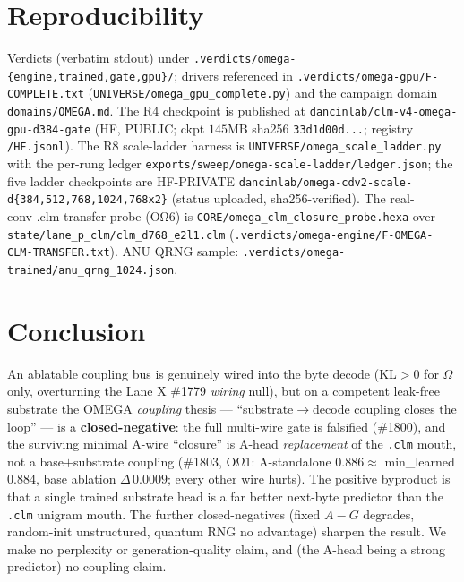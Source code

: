 \documentclass[11pt]{article}
\begin{document}
\section{Reproducibility}
\label{sec:repro}
Verdicts (verbatim stdout) under \texttt{.verdicts/omega-\{engine,trained,gate,gpu\}/}; drivers
referenced in \texttt{.verdicts/omega-gpu/F-COMPLETE.txt} (\texttt{UNIVERSE/omega\_gpu\_complete.py})
and the campaign domain \texttt{domains/OMEGA.md}. The R4 checkpoint is published at
\texttt{dancinlab/clm-v4-omega-gpu-d384-gate} (HF, PUBLIC; ckpt $145$MB
sha256 \texttt{33d1d00d...}; registry \texttt{/HF.jsonl}). The R8 scale-ladder harness is
\texttt{UNIVERSE/omega\_scale\_ladder.py} with the per-rung ledger
\texttt{exports/sweep/omega-scale-ladder/ledger.json}; the five ladder checkpoints are HF-PRIVATE
\texttt{dancinlab/omega-cdv2-scale-d\{384,512,768,1024,768x2\}} (status uploaded, sha256-verified).
The real-conv-.clm transfer probe (OΩ6) is
\texttt{CORE/omega\_clm\_closure\_probe.hexa} over
\texttt{state/lane\_p\_clm/clm\_d768\_e2l1.clm}
(\texttt{.verdicts/omega-engine/F-OMEGA-CLM-TRANSFER.txt}). ANU QRNG sample:
\texttt{.verdicts/omega-trained/anu\_qrng\_1024.json}.

\section{Conclusion}
\label{sec:conclusion}
An ablatable coupling bus is genuinely wired into the byte decode (KL$>0$ for $\Omega$ only,
overturning the Lane X \#1779 \emph{wiring} null), but on a competent leak-free substrate the
OMEGA \emph{coupling} thesis --- ``substrate$\rightarrow$decode coupling closes the loop'' ---
is a \textbf{closed-negative}: the full multi-wire gate is falsified (\#1800), and the surviving
minimal A-wire ``closure'' is A-head \emph{replacement} of the \texttt{.clm} mouth, not a
base$+$substrate coupling (\#1803, OΩ1: A-standalone $0.886\approx$ min\_learned $0.884$, base
ablation $\Delta\,0.0009$; every other wire hurts). The positive byproduct is that a single
trained substrate head is a far better next-byte predictor than the \texttt{.clm} unigram mouth.
The further closed-negatives (fixed $A{-}G$ degrades, random-init unstructured, quantum RNG no
advantage) sharpen the result. We make no perplexity or generation-quality claim, and (the
A-head being a strong predictor) no coupling claim.

\nocite{anima_omega_engine_1783,anima_omega_trained_1784,anima_omega_gate_1786,%
anima_omega_gpu_1791,anima_lanex_1779}


\end{document}

